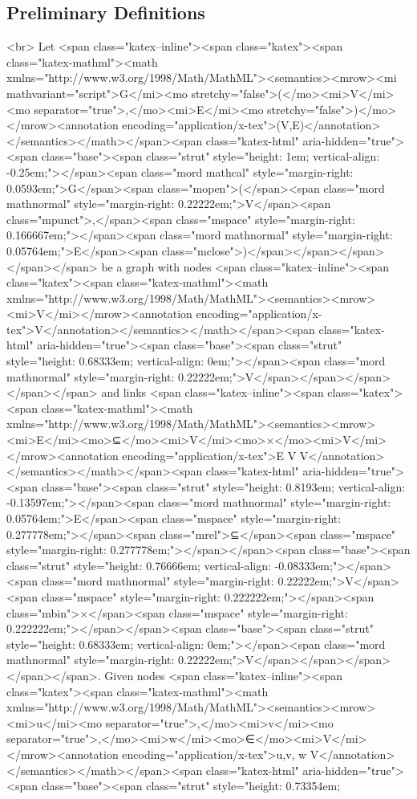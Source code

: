 \subsection{Preliminary Definitions}<br>
Let <span class="katex--inline"><span class="katex"><span class="katex-mathml"><math xmlns="http://www.w3.org/1998/Math/MathML"><semantics><mrow><mi mathvariant="script">G</mi><mo stretchy="false">(</mo><mi>V</mi><mo separator="true">,</mo><mi>E</mi><mo stretchy="false">)</mo></mrow><annotation encoding="application/x-tex">(V,E)</annotation></semantics></math></span><span class="katex-html" aria-hidden="true"><span class="base"><span class="strut" style="height: 1em; vertical-align: -0.25em;"></span><span class="mord mathcal" style="margin-right: 0.0593em;">G</span><span class="mopen">(</span><span class="mord mathnormal" style="margin-right: 0.22222em;">V</span><span class="mpunct">,</span><span class="mspace" style="margin-right: 0.166667em;"></span><span class="mord mathnormal" style="margin-right: 0.05764em;">E</span><span class="mclose">)</span></span></span></span></span> be a graph with nodes <span class="katex--inline"><span class="katex"><span class="katex-mathml"><math xmlns="http://www.w3.org/1998/Math/MathML"><semantics><mrow><mi>V</mi></mrow><annotation encoding="application/x-tex">V</annotation></semantics></math></span><span class="katex-html" aria-hidden="true"><span class="base"><span class="strut" style="height: 0.68333em; vertical-align: 0em;"></span><span class="mord mathnormal" style="margin-right: 0.22222em;">V</span></span></span></span></span> and links <span class="katex--inline"><span class="katex"><span class="katex-mathml"><math xmlns="http://www.w3.org/1998/Math/MathML"><semantics><mrow><mi>E</mi><mo>⊆</mo><mi>V</mi><mo>×</mo><mi>V</mi></mrow><annotation encoding="application/x-tex">E \subseteq V \times V</annotation></semantics></math></span><span class="katex-html" aria-hidden="true"><span class="base"><span class="strut" style="height: 0.8193em; vertical-align: -0.13597em;"></span><span class="mord mathnormal" style="margin-right: 0.05764em;">E</span><span class="mspace" style="margin-right: 0.277778em;"></span><span class="mrel">⊆</span><span class="mspace" style="margin-right: 0.277778em;"></span></span><span class="base"><span class="strut" style="height: 0.76666em; vertical-align: -0.08333em;"></span><span class="mord mathnormal" style="margin-right: 0.22222em;">V</span><span class="mspace" style="margin-right: 0.222222em;"></span><span class="mbin">×</span><span class="mspace" style="margin-right: 0.222222em;"></span></span><span class="base"><span class="strut" style="height: 0.68333em; vertical-align: 0em;"></span><span class="mord mathnormal" style="margin-right: 0.22222em;">V</span></span></span></span></span>. Given nodes <span class="katex--inline"><span class="katex"><span class="katex-mathml"><math xmlns="http://www.w3.org/1998/Math/MathML"><semantics><mrow><mi>u</mi><mo separator="true">,</mo><mi>v</mi><mo separator="true">,</mo><mi>w</mi><mo>∈</mo><mi>V</mi></mrow><annotation encoding="application/x-tex">u,v, w \in V</annotation></semantics></math></span><span class="katex-html" aria-hidden="true"><span class="base"><span class="strut" style="height: 0.73354em; 